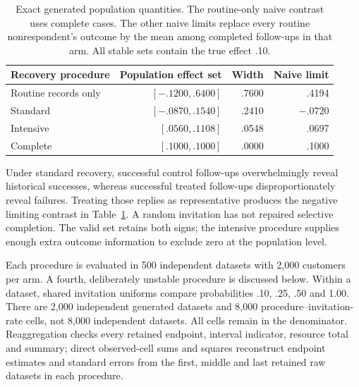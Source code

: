 \begin{table}[htbp]
\centering\small
\begin{tabular}{lrrr}
\toprule
Recovery procedure & Population effect set & Width & Naive limit\\
\midrule
Routine records only & $[-.1200,.6400]$ & .7600 & .4194\\
Standard & $[-.0870,.1540]$ & .2410 & $-.0720$\\
Intensive & $[.0560,.1108]$ & .0548 & .0697\\
Complete & $[.1000,.1000]$ & .0000 & .1000\\
\bottomrule
\end{tabular}
\caption{Exact generated population quantities. The routine-only naive
contrast uses complete cases. The other naive limits replace every routine
nonrespondent's outcome by the mean among completed follow-ups in that arm.
All stable sets contain the true effect .10.}
\label{rel73:population}
\end{table}

Under standard recovery, successful control follow-ups overwhelmingly reveal
historical successes, whereas successful treated follow-ups disproportionately
reveal failures. Treating those replies as representative produces the
negative limiting contrast in Table~\ref{rel73:population}. A random
invitation has not repaired selective completion. The valid set retains
both signs; the intensive procedure supplies enough extra outcome information
to exclude zero at the population level.

Each procedure is evaluated in 500 independent datasets with 2,000 customers
per arm. A fourth, deliberately unstable procedure is discussed below.
Within a dataset, shared invitation uniforms compare probabilities
.10, .25, .50 and 1.00. There are 2,000 independent generated datasets and
8,000 procedure--invitation-rate cells, not 8,000 independent datasets.
All cells remain in the denominator. Reaggregation checks every retained
endpoint, interval indicator, resource total and summary; direct observed-cell
sums and squares reconstruct endpoint estimates and standard errors from
the first, middle and last retained raw datasets in each procedure.

